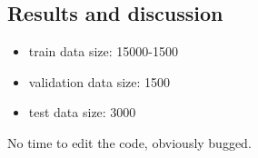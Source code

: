 \documentclass{article}
\begin{document}
\subsection*{Results and discussion}

\begin{itemize}
    \item train data size: 15000-1500
    \item validation data size: 1500
    \item test data size: 3000
\end{itemize}

No time to edit the code, obviously bugged.


\newpage

%
%

\newpage
\appendix
\end{document}
